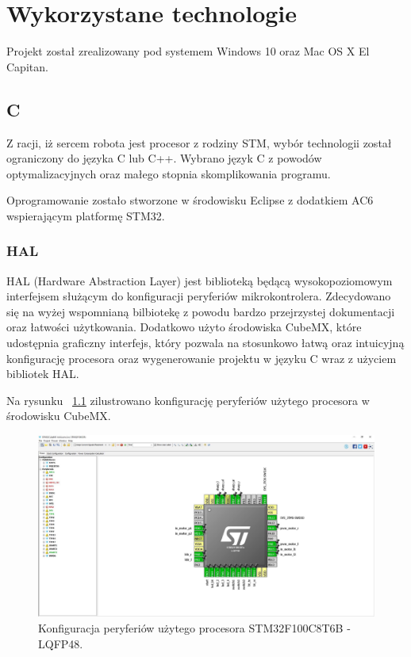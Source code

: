 \chapter{Wykorzystane technologie}

Projekt został zrealizowany pod systemem Windows 10 oraz Mac OS X El Capitan. 

\section{C}
Z racji, iż sercem robota jest procesor z rodziny STM, wybór technologii został ograniczony do języka C lub C++. Wybrano język C z powodów optymalizacyjnych oraz małego stopnia skomplikowania programu. 


Oprogramowanie zostało stworzone w środowisku Eclipse z dodatkiem AC6 wspierającym platformę STM32.

\subsection{HAL}
HAL (Hardware Abstraction Layer) jest biblioteką będącą wysokopoziomowym interfejsem służącym do konfiguracji peryferiów mikrokontrolera. Zdecydowano się na wyżej wspomnianą bilbiotekę z powodu bardzo przejrzystej dokumentacji oraz łatwości użytkowania. Dodatkowo użyto środowiska CubeMX, które udostępnia graficzny interfejs, który pozwala na stosunkowo łatwą oraz intuicyjną konfigurację procesora oraz wygenerowanie projektu w języku C wraz z użyciem bibliotek HAL.


Na rysunku ~\ref{fig:cubemx} zilustrowano konfigurację peryferiów użytego procesora w środowisku CubeMX.   

\begin{figure}[H]
	\centering
		\includegraphics[width=0.75\linewidth]{pic02/cubemx.jpg}
	\caption{Konfiguracja peryferiów użytego procesora STM32F100C8T6B - LQFP48.}
	\label{fig:cubemx}	
\end{figure}


